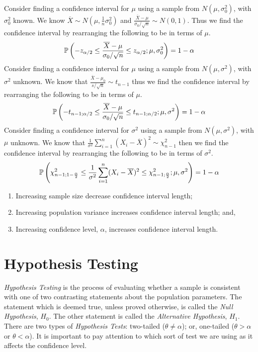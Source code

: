 \documentclass[11pt,a4paper]{article}
\begin{document}
Consider finding a confidence interval for $\mu$ using a sample from $N(\mu,\sigma^2_0)$, with $\sigma^2_0$ known. We know $\overline{X}\sim N(\mu,\frac{1}{n}\sigma_0^2)$ and $\frac{\overline{X}-\mu}{\sigma_0/\sqrt{n}}\sim N(0,1)$. Thus we find the confidence interval by rearranging the following to be in terms of $\mu$.
$$\mathbb{P}\left(-z_{\alpha/2}\leq\dfrac{\overline{X}-\mu}{\sigma_0/\sqrt{n}}\leq z_{\alpha/2};\mu,\sigma_0^2\right)=1-\alpha$$
Consider finding a confidence interval for $\mu$ using a sample from $N(\mu,\sigma^2)$, with $\sigma^2$ unknown. We know that $\frac{\overline{X}-\mu_0}{s/\sqrt{n}}\sim t_{n-1}$ thus we find the confidence interval by rearranging the following to be in terms of $\mu$.
$$\mathbb{P}\left(-t_{n-1;\alpha/2}\leq\dfrac{\overline{X}-\mu}{\sigma_0/\sqrt{n}}\leq t_{n-1;\alpha/2};\mu,\sigma^2\right)=1-\alpha$$
Consider finding a confidence interval for $\sigma^2$ using a sample from $N(\mu,\sigma^2)$, with $\mu$ unknown. We know that $\frac{1}{\sigma^2}\sum_{i=1}^n(X_i-\overline{X})^2\sim\chi_{n-1}^2$ then we find the confidence interval by rearranging the following to be in terms of $\sigma^2$.
$$\mathbb{P}\left(\chi^2_{n-1;1-\frac{\alpha}{2}}\leq\frac{1}{\sigma^2}\sum_{i=1}^n(X_i-\overline{X})^2\leq\chi^2_{n-1;\frac{\alpha}{2}};\mu,\sigma^2\right)=1-\alpha$$


\begin{enumerate}
	\item Increasing sample size decrease confidence interval length;
	\item Increasing population variance increases confidence interval length; and,
	\item Increasing confidence level, $\alpha$, increases confidence interval length.
\end{enumerate}

\section{Hypothesis Testing}

\textit{Hypothesis Testing} is the process of evaluating whether a sample is consistent with one of two contrasting statements about the population parameters. The statement which is deemed true, unless proved otherwise, is called the \textit{Null Hypothesis}, $H_0$. The other statement is called the \textit{Alternative Hypothesis}, $H_1$. There are two types of \textit{Hypothesis Tests}: two-tailed ($\theta\neq\alpha$); or, one-tailed ($\theta>\alpha$ or $\theta<\alpha$). It is important to pay attention to which sort of test we are using as it affects the confidence level.\\
\end{document}

